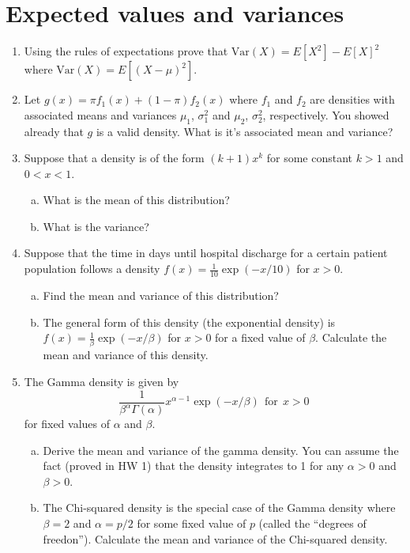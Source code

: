 \documentclass[12pt]{article}
\newcommand{\Var}{\mathrm{Var}}
\begin{document}
\section{Expected values and variances}
\begin{enumerate}[1.]
\item  Using the rules of expectations prove that $\Var(X) = E[X^2] - E[X]^2$
  where $\Var(X) = E[(X - \mu)^2]$.
\item Let $g(x) = \pi f_1(x) + (1 - \pi)f_2(x)$ where $f_1$ and $f_2$
  are densities with associated means and variances $\mu_1$,
  $\sigma^2_1$ and $\mu_2$, $\sigma^2_2$, respectively. You showed
  already that $g$ is a valid density. What is it's associated mean
  and variance?
\item  Suppose that a density is of the form $(k + 1)x^k$ for some constant $k > 1$ and $0 < x < 1$.
  \begin{enumerate}[a.]
  \item What is the mean of this distribution?
  \item What is the variance?
  \end{enumerate}
\item Suppose that the time in days until hospital discharge for a certain patient population
follows a density $f(x) = \frac{1}{10}\exp(-x/10)$ for $x > 0$. 
\begin{enumerate}[a.]
\item Find the mean and variance of this distribution?
\item The general form of this density (the exponential density) is $f(x) = \frac{1}{\beta}\exp(-x/\beta)$ for $x > 0$ for a fixed value of $\beta$. Calculate the mean and variance of this density.
\end{enumerate}
\item The Gamma density is given by     
	$$
	\frac{1}{\beta^\alpha\Gamma(\alpha)} x^{\alpha - 1} \exp(-x/\beta) ~~ \mbox{for} ~~ x > 0    
    $$ 	
for fixed values of $\alpha$ and $\beta$.
\begin{enumerate}[a.]
\item Derive the mean and variance of the gamma density. You can assume the fact (proved in HW 1) that the density integrates to 1 for any $\alpha > 0$ and $\beta > 0$.
\item The Chi-squared density is the special case of the Gamma density where $\beta = 2$ and 
$\alpha = p / 2$ for some fixed value of $p$ (called the ``degrees of freedon''). Calculate the
mean and variance of the Chi-squared density.
\end{enumerate}

\end{enumerate}
\end{document}

